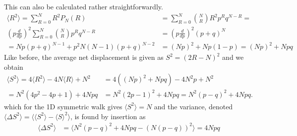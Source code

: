 This can also be calculated rather straightforwardly. 
\begin{align*}
  \langle R^2\rangle =  \sum\limits_{R=0}^N R^2P_N(R) &=  \sum\limits_{R=0}^N {N\choose R}R^2p^Rq^{N-R} = \\
 \left(p\frac{d}{dp}\right)^2 \sum\limits_{R=0}^N {N\choose R}p^Rq^{N-R} &= \left(p\frac{d}{dp}\right)^2(p+q)^N \\
 = Np(p+q)^{N-1} +p^2N(N-1)(p+q)^{N-2} &= (Np)^2 +Np(1-p) = (Np)^2 +Npq
\end{align*}
Like before, the average net displacement is given as $S^2 = (2R-N)^2$ and we obtain
\begin{align*}
 \langle S^2\rangle = 4\langle R^2\rangle -4N\langle R\rangle + N^2 &= 4((Np)^2 +Npq) -4N^2p + N^2\\
 = N^2(4p^2 -4p +1) +4Npq &= N^2(2p-1)^2 +4Npq = N^2(p-q)^2 +4Npq.
\end{align*}
which for the 1D symmetric walk gives $\langle S^2\rangle =N$ and the variance, denoted $\langle\Delta S^2\rangle = \langle\langle S^2\rangle-\langle S\rangle^2\rangle$, is found by insertion as
\begin{align}
 \langle\Delta S^2\rangle &= \langle N^2(p-q)^2 +4Npq - ( N(p-q))^2\rangle= 4Npq 
\end{align}

